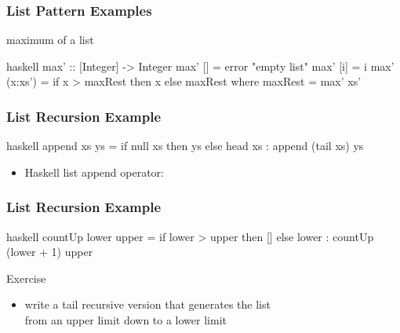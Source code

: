 \documentclass[dvipsnames]{beamer}
\theoremstyle{plain}
\begin{document}
\begin{frame}[fragile]
  \frametitle{List Pattern Examples}

  \begin{exampleblock}{maximum of a list}
    \begin{pygments}{haskell}
max' :: [Integer] -> Integer
max' [] = error "empty list"
max' [i] = i
max' (x:xs') = if x > maxRest then x else maxRest
  where maxRest = max' xs'
    \end{pygments}
  \end{exampleblock}
\end{frame}

\begin{frame}[fragile]
  \frametitle{List Recursion Example}

  \begin{example}
    \pause
    \begin{pygments}{haskell}
append xs ys =
    if null xs
    then ys
    else head xs : append (tail xs) ys
    \end{pygments}
  \end{example}

  \pause
  \begin{itemize}
    \item Haskell list append operator: 
  \end{itemize}
\end{frame}

\begin{frame}[fragile]
  \frametitle{List Recursion Example}

  \begin{example}
    \pause
    \begin{pygments}{haskell}
countUp lower upper =
    if lower > upper
    then []
    else lower : countUp (lower + 1) upper
    \end{pygments}
  \end{example}

  \pause
  \begin{block}{Exercise}
    \begin{itemize}
      \item write a tail recursive version that generates the list\\
        from an upper limit down to a lower limit
    \end{itemize}
  \end{block}
\end{frame}
\end{document}
